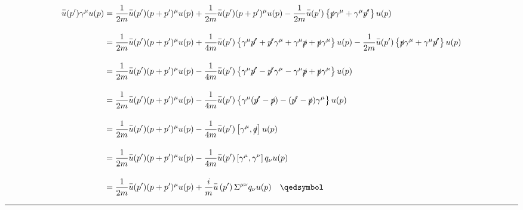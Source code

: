 \begin{solution}
\begin{align}
    \overbar{u}(p')\gamma^\mu u(p) &=   \frac{1}{2m}   \overbar{u}(p') (p+p')^\mu  u(p) + \frac{1}{2m}   \overbar{u}(p') (p+p')^\mu  u(p)  - \frac{1}{2m} \overbar{u}(p') \left\{ \slashed{p}\gamma^\mu + \gamma^\mu \slashed{p'} \right\}  u(p)  \nonumber \\[0.15in]
                                   &=   \frac{1}{2m}   \overbar{u}(p') (p+p')^\mu  u(p) + \frac{1}{4m} \overbar{u}(p') \left\{ \gamma^\mu \slashed{p'} + \slashed{p'}\gamma^\mu + \gamma^\mu \slashed{p} + \slashed{p}\gamma^\mu \right\} u(p) - \frac{1}{2m} \overbar{u}(p') \left\{ \slashed{p}\gamma^\mu + \gamma^\mu \slashed{p'} \right\}  u(p)  \nonumber \\[0.15in]
                                   &=   \frac{1}{2m}   \overbar{u}(p') (p+p')^\mu  u(p) - \frac{1}{4m} \overbar{u}(p') \left\{  \gamma^\mu \slashed{p'} - \slashed{p'}\gamma^\mu - \gamma^\mu \slashed{p} + \slashed{p}\gamma^\mu \right\} u(p)  \nonumber \\[0.15in]
                                   &=   \frac{1}{2m}   \overbar{u}(p') (p+p')^\mu  u(p) - \frac{1}{4m} \overbar{u}(p') \left\{ \gamma^\mu (\slashed{p'}-\slashed{p}) - (\slashed{p'}-\slashed{p}) \gamma^\mu \right\} u(p)  \nonumber \\[0.15in]
                                   &=   \frac{1}{2m}   \overbar{u}(p') (p+p')^\mu  u(p) - \frac{1}{4m} \overbar{u}(p') \left[  \gamma^\mu , \slashed{q} \right] u(p)  \nonumber \\[0.15in]
                                   &=   \frac{1}{2m}   \overbar{u}(p') (p+p')^\mu  u(p) - \frac{1}{4m} \overbar{u}(p') \left[  \gamma^\mu , \gamma^\nu \right] q_\nu u(p)  \nonumber \\[0.15in]
                                   &=   \frac{1}{2m}   \overbar{u}(p') (p+p')^\mu  u(p) + \frac{i}{m} \overbar{u}\left(p'\right) \Sigma^{\mu\nu} q_\nu u(p) \qed \nonumber
\end{align}
\end{solution}

\noindent\rule{7in}{1.5pt}


